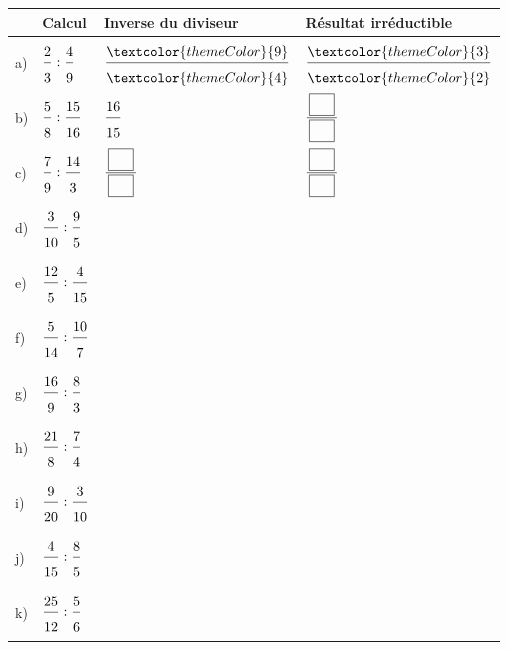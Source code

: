\newpage
{}
 
\def\arraystretch{3}
\begin{tabularx}{\linewidth}{|>{\centering\arraybackslash}p{0.8cm}|>{\centering\arraybackslash}X|>{\centering\arraybackslash}X|>{\centering\arraybackslash}X|}
\hline
\cellcolor{themeNO!30} & \cellcolor{themeNO!30}\textbf{Calcul} & \cellcolor{themeNO!30}\textbf{Inverse du diviseur} & \cellcolor{themeNO!30}\textbf{Résultat irréductible} \\\hline
a) & $\FA{2}{3}:\FA{4}{9}$ & $\FA{\textcolor{themeColor}{9}}{\textcolor{themeColor}{4}}$ & $\FA{\textcolor{themeColor}{3}}{\textcolor{themeColor}{2}}$ \\\hline
b) & $\FA{5}{8}:\FA{15}{16}$ & $\FA{16}{15}$ & $\FA{\CaseC}{\CaseC}$ \\\hline
c) & $\FA{7}{9}:\FA{14}{3}$ & $\FA{\CaseC}{\CaseC}$ & $\FA{\CaseC}{\CaseC}$ \\\hline
d) & $\FA{3}{10}:\FA{9}{5}$ &  &  \\\hline
e) & $\FA{12}{5}:\FA{4}{15}$ &  &  \\\hline
f) & $\FA{5}{14}:\FA{10}{7}$ &  &  \\\hline
g) & $\FA{16}{9}:\FA{8}{3}$ &  &  \\\hline
h) & $\FA{21}{8}:\FA{7}{4}$ &  &  \\\hline
i) & $\FA{9}{20}:\FA{3}{10}$ &  &  \\\hline
j) & $\FA{4}{15}:\FA{8}{5}$ &  &  \\\hline
k) & $\FA{25}{12}:\FA{5}{6}$ &  &  \\\hline
\end{tabularx}
\def\arraystretch{1}
 
\newpage
{}
 
